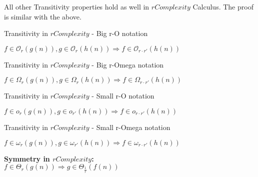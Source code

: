 All other Transitivity properties hold as well in $rComplexity$ Calculus. The proof is similar with the above.
\begin{theorem}
    Transitivity in $rComplexity$ - Big r-O notation

    $ f \in \mathcal{O}_{r}(g(n)), g \in \mathcal{O}_{r}(h(n)) \Rightarrow  f \in \mathcal{O}_{r \cdot r'}(h(n))$
\end{theorem}
\begin{theorem}
    Transitivity in $rComplexity$ - Big r-Omega notation

    $ f \in \Omega_{r}(g(n)), g \in \Omega_{r}(h(n)) \Rightarrow  f \in \Omega_{r \cdot r'}(h(n))$
\end{theorem}
\begin{theorem}
    Transitivity in $rComplexity$ - Small r-O notation

    $ f \in o_{r}(g(n)), g \in o_{r'}(h(n)) \Rightarrow  f \in o_{r \cdot r'}(h(n))$
\end{theorem}
\begin{theorem}
    Transitivity in $rComplexity$ - Small r-Omega notation

    $ f \in \omega_{r}(g(n)), g \in \omega_{r'}(h(n)) \Rightarrow  f \in \omega_{r \cdot r'}(h(n))$
\end{theorem}

\begin{theorem}
    \textbf{Symmetry in $rComplexity$:}  \\  $ f \in \Theta_{r}(g(n)) \Rightarrow g \in \Theta_{\frac{1}{r}}(f(n)) $
\end{theorem}

